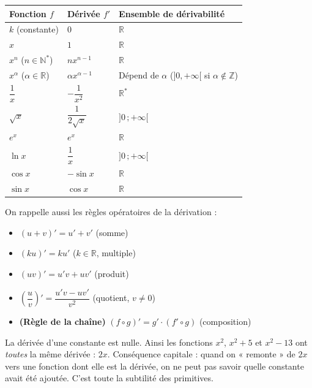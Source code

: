 \documentclass[11pt]{article}
\begin{document}
\begin{center}
\begin{tabularx}{\linewidth}{|l|l|X|}
\hline
\rowcolor{popblueL}
Fonction $f$ & Dérivée $f'$ & Ensemble de dérivabilité \\
\hline
$k$ (constante) & $0$ & $\mathbb{R}$ \\
\hline
$x$ & $1$ & $\mathbb{R}$ \\
\hline
$x^n$ ($n\in\mathbb{N}^*$) & $n x^{n-1}$ & $\mathbb{R}$ \\
\hline
$x^{\alpha}$ ($\alpha\in\mathbb{R}$) & $\alpha x^{\alpha-1}$ & Dépend de $\alpha$ ($]0,+\infty[$ si $\alpha\notin\mathbb{Z}$) \\
\hline
$\dfrac{1}{x}$ & $-\dfrac{1}{x^2}$ & $\mathbb{R}^*$ \\
\hline
$\sqrt{x}$ & $\dfrac{1}{2\sqrt{x}}$ & $]0\,;+\infty[$ \\
\hline
$e^{x}$ & $e^{x}$ & $\mathbb{R}$ \\
\hline
$\ln x$ & $\dfrac{1}{x}$ & $]0\,;+\infty[$ \\
\hline
$\cos x$ & $-\sin x$ & $\mathbb{R}$ \\
\hline
$\sin x$ & $\cos x$ & $\mathbb{R}$ \\
\hline
\end{tabularx}
\end{center}

On rappelle aussi les règles opératoires de la dérivation :
\begin{itemize}
\item $(u+v)' = u' + v'$ \quad (somme)
\item $(ku)' = k u'$ \quad ($k\in\mathbb{R}$, multiple)
\item $(uv)' = u'v + uv'$ \quad (produit)
\item $\left(\dfrac{u}{v}\right)' = \dfrac{u'v - uv'}{v^2}$ \quad (quotient, $v\neq 0$)
\item \textbf{(Règle de la chaîne)} $(f \circ g)' = g' \cdot (f' \circ g)$ \quad (composition)
\end{itemize}

\begin{attention}
La dérivée d'une constante est nulle. Ainsi les fonctions $x^2$, $x^2+5$ et $x^2-13$ ont \emph{toutes} la même dérivée : $2x$. Conséquence capitale : quand on « remonte » de $2x$ vers une fonction dont elle est la dérivée, on ne peut pas savoir quelle constante avait été ajoutée. C'est toute la subtilité des primitives.
\end{attention}
\end{document}

